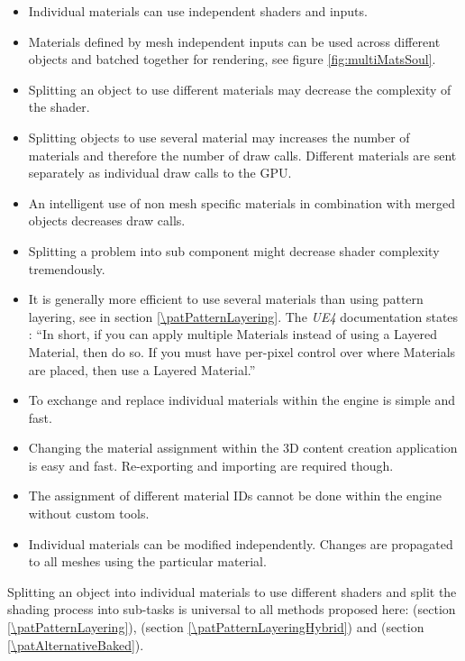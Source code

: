 \begin{description}
\begin{description}
\begin{itemize}
				\item Individual materials can use independent shaders and inputs. 
				\item Materials defined by mesh independent inputs can be used across different objects and batched together for rendering, see figure \ref{fig:multiMatsSoul}. 	
				\item Splitting an object to use different materials may decrease the complexity of the shader.
			\end{itemize}
			\item[\performance:]\hfill
			\begin{itemize}\mynobreakpar
				\item Splitting objects to use several material may increases the number of materials and therefore the number of draw calls. Different materials are sent separately as individual draw calls to the GPU. 
				\item An intelligent use of non mesh specific materials in combination with merged objects decreases draw calls.  
				\item Splitting a problem into sub component might decrease shader complexity tremendously. 
				\item It is generally more efficient to use several materials than using pattern layering, see \emph{\patPatternLayering} in section \ref{\patPatternLayering}. The \emph{UE4} documentation states \cite{epic2015LayeredMats}: ``In short, if you can apply multiple Materials instead of using a Layered Material, then do so. If you must have per-pixel control over where Materials are placed, then use a Layered Material.'' 
			\end{itemize}
			\item[\pipeline:]\hfill
			\begin{itemize}\mynobreakpar
				\item To exchange and replace individual materials within the engine is simple and fast. 
				\item Changing the material assignment within the 3D content creation application is easy and fast. Re-exporting and importing are required though. 
				\item The assignment of different material IDs cannot be done within the engine without custom tools.
				\item Individual materials can be modified independently. Changes are propagated to all meshes using the particular material. 
			\end{itemize}
		\end{description}
	\item[\patRelations:]%
	Splitting an object into individual materials to use different shaders and split the shading process into sub-tasks is universal to all methods proposed here: \emph{\patPatternLayering} (section \ref{\patPatternLayering}), \emph{\patPatternLayeringHybrid} (section \ref{\patPatternLayeringHybrid}) and \emph{\patAlternativeBaked} (section \ref{\patAlternativeBaked}).
\end{description}


